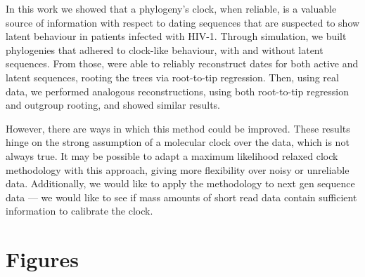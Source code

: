 \documentclass[12pt]{article}
\begin{document}
In this work we showed that a phylogeny's clock, when reliable, is a valuable source of information with respect to dating sequences that are suspected to show latent behaviour in patients infected with HIV-1. 
Through simulation, we built phylogenies that adhered to clock-like behaviour, with and without latent sequences.
From those, were able to reliably reconstruct dates for both active and latent sequences, rooting the trees via root-to-tip regression.
Then, using real data, we performed analogous reconstructions, using both root-to-tip regression and outgroup rooting, and showed similar results.

However, there are ways in which this method could be improved. 
These results hinge on the strong assumption of a molecular clock over the data, which is not always true. 
It may be possible to adapt a maximum likelihood relaxed clock methodology with this approach, giving more flexibility over noisy or unreliable data. 
Additionally, we would like to apply the methodology to next gen sequence data --- we would like to see if mass amounts of short read data contain sufficient information to calibrate the clock.



\clearpage





\clearpage


\section * {Figures}
\end{document}
